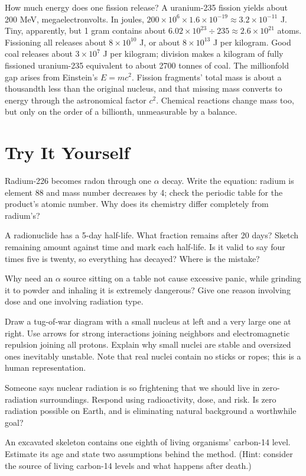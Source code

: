 \begin{tiaozhan}
How much energy does one fission release? A uranium-235 fission yields about 200 MeV, megaelectronvolts. In joules, $200\times 10^{6}\times 1.6\times 10^{-19}\approx 3.2\times 10^{-11}$ J. Tiny, apparently, but 1 gram contains about $6.02\times 10^{23}\div 235\approx 2.6\times 10^{21}$ atoms. Fissioning all releases about $8\times 10^{10}$ J, or about $8\times 10^{13}$ J per kilogram. Good coal releases about $3\times 10^{7}$ J per kilogram; division makes a kilogram of fully fissioned uranium-235 equivalent to about 2700 tonnes of coal. The millionfold gap arises from Einstein's $E=mc^{2}$. Fission fragments' total mass is about a thousandth less than the original nucleus, and that missing mass converts to energy through the astronomical factor $c^2$. Chemical reactions change mass too, but only on the order of a billionth, unmeasurable by a balance.
\end{tiaozhan}

\section*{Try It Yourself}

\begin{sikaoti}
\item Radium-226 becomes radon through one $\alpha$ decay. Write the equation: radium is element 88 and mass number decreases by 4; check the periodic table for the product's atomic number. Why does its chemistry differ completely from radium's?
\item A radionuclide has a 5-day half-life. What fraction remains after 20 days? Sketch remaining amount against time and mark each half-life. Is it valid to say four times five is twenty, so everything has decayed? Where is the mistake?
\item Why need an $\alpha$ source sitting on a table not cause excessive panic, while grinding it to powder and inhaling it is extremely dangerous? Give one reason involving dose and one involving radiation type.
\item Draw a tug-of-war diagram with a small nucleus at left and a very large one at right. Use arrows for strong interactions joining neighbors and electromagnetic repulsion joining all protons. Explain why small nuclei are stable and oversized ones inevitably unstable. Note that real nuclei contain no sticks or ropes; this is a human representation.
\item Someone says nuclear radiation is so frightening that we should live in zero-radiation surroundings. Respond using radioactivity, dose, and risk. Is zero radiation possible on Earth, and is eliminating natural background a worthwhile goal?
\item An excavated skeleton contains one eighth of living organisms' carbon-14 level. Estimate its age and state two assumptions behind the method. (Hint: consider the source of living carbon-14 levels and what happens after death.)
\end{sikaoti}
